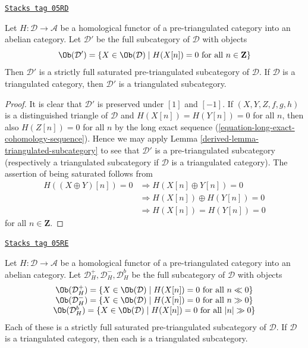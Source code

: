 \begin{lemma}
\label{derived-lemma-homological-functor-kernel}
\href{https://stacks.math.columbia.edu/tag/05RD}{\texttt{Stacks tag 05RD}}

Let $H : \mathcal{D} \to \mathcal{A}$ be a homological functor of
a pre-triangulated category into an abelian category.
Let $\mathcal{D}'$ be the full subcategory of $\mathcal{D}$ with objects
$$
\Ob(\mathcal{D}') =
\{X \in \Ob(\mathcal{D}) \mid
H(X[n]) = 0\text{ for all }n \in \mathbf{Z}\}
$$
Then $\mathcal{D}'$ is a strictly full saturated pre-triangulated subcategory
of $\mathcal{D}$. If $\mathcal{D}$ is a triangulated category, then
$\mathcal{D}'$ is a triangulated subcategory.
\end{lemma}

\begin{proof}

It is clear that $\mathcal{D}'$ is preserved under $[1]$ and $[-1]$.
If $(X, Y, Z, f, g, h)$ is a distinguished triangle of $\mathcal{D}$
and $H(X[n]) = H(Y[n]) = 0$ for all $n$, then also $H(Z[n]) = 0$ for all $n$
by the long exact sequence (\ref{equation-long-exact-cohomology-sequence}).
Hence we may apply
Lemma \ref{derived-lemma-triangulated-subcategory}
to see that $\mathcal{D}'$ is a pre-triangulated subcategory (respectively
a triangulated subcategory if $\mathcal{D}$ is a triangulated category).
The assertion of being saturated follows from
\begin{align*}
H((X \oplus Y)[n]) = 0 & \Rightarrow H(X[n] \oplus Y[n]) = 0 \\
& \Rightarrow H(X[n]) \oplus H(Y[n]) = 0 \\
& \Rightarrow H(X[n]) = H(Y[n]) = 0
\end{align*}
for all $n \in \mathbf{Z}$.
\end{proof}

\begin{lemma}
\label{derived-lemma-homological-functor-bounded}
\href{https://stacks.math.columbia.edu/tag/05RE}{\texttt{Stacks tag 05RE}}

Let $H : \mathcal{D} \to \mathcal{A}$ be a homological functor of
a pre-triangulated category into an abelian category.
Let $\mathcal{D}_H^{+}, \mathcal{D}_H^{-}, \mathcal{D}_H^b$
be the full subcategory of $\mathcal{D}$ with objects
$$
\begin{matrix}
\Ob(\mathcal{D}_H^{+}) =
\{X \in \Ob(\mathcal{D}) \mid
H(X[n]) = 0\text{ for all }n \ll 0\} \\
\Ob(\mathcal{D}_H^{-}) =
\{X \in \Ob(\mathcal{D}) \mid
H(X[n]) = 0\text{ for all }n \gg 0\} \\
\Ob(\mathcal{D}_H^b) =
\{X \in \Ob(\mathcal{D}) \mid
H(X[n]) = 0\text{ for all }|n| \gg 0\}
\end{matrix}
$$
Each of these is a strictly full saturated pre-triangulated subcategory
of $\mathcal{D}$. If $\mathcal{D}$ is a triangulated category, then
each is a triangulated subcategory.
\end{lemma}

